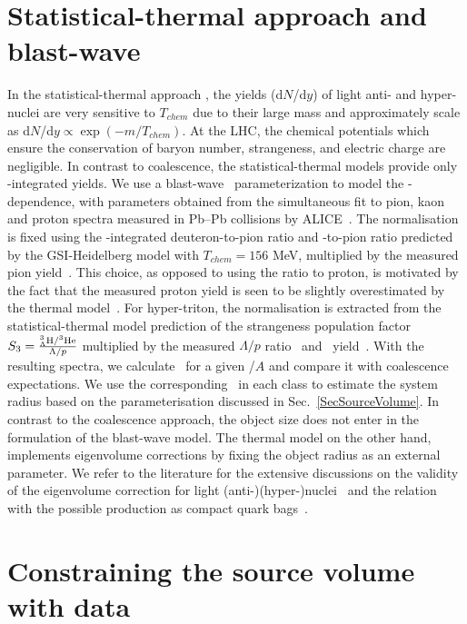\documentclass[%
 reprint,
 amsmath,amssymb,
 aps,
]{revtex4-1}
\begin{document}
\section{Statistical-thermal approach and blast-wave}\label{sec:thermal}
In the statistical-thermal approach \cite{Petran:2013dva,Wheaton:2004qb,Andronic:2005yp}, the yields (d$N$/d$y$) of light anti- and hyper-nuclei are very sensitive to $T_{chem}$ due to their large mass and approximately scale as d$N$/d$y \propto \exp(-m/T_{chem})$. 
At the LHC, the chemical potentials which ensure the conservation of baryon number, strangeness, and electric charge are negligible.
In contrast to coalescence, the statistical-thermal models provide only \pt-integrated yields. 
We use a blast-wave~\cite{Schnedermann:1993ws} parameterization to model the \pt-dependence, with parameters obtained from the simultaneous fit to pion, kaon and proton spectra measured in Pb--Pb collisions by ALICE~\cite{Abelev:2013vea}. 
The normalisation is fixed using the \pt-integrated deuteron-to-pion ratio and \hethree-to-pion ratio predicted by the GSI-Heidelberg model with $T_{chem} = 156$ MeV, multiplied by the measured pion yield~\cite{Abelev:2013vea}. 
This choice, as opposed to using the ratio to proton, is motivated by the fact that the measured proton yield is seen to be slightly overestimated by the thermal model~\cite{Abelev:2012wca}.
For hyper-triton, the normalisation is extracted from the statistical-thermal model prediction of the strangeness population factor $S_{3} = { _{\Lambda}^{3}\mathrm{H} / ^{3}{\mathrm{He}} \over \Lambda/p}$ multiplied by the measured $\Lambda/p$ ratio~\cite{Abelev:2013vea,Abelev:2013xaa} and \hethree~yield~\cite{ALICE:deuteronppPbPb2015}. 
With the resulting spectra, we calculate \bA~for a given \pt/$A$ and compare it with coalescence expectations. 
We use the corresponding \avdNdeta~in each class to estimate the system radius based on the parameterisation discussed in Sec.~\ref{SecSourceVolume}. 
In contrast to the coalescence approach, the object size does not enter in the formulation of the blast-wave model.
The thermal model on the other hand, implements eigenvolume corrections by fixing the object radius as an external parameter.
We refer to the literature for the extensive discussions on the validity of the eigenvolume correction for light \mbox{(anti-)(hyper-)}nuclei~\cite{Vovchenko:2016mwg} and the relation with the possible production as compact quark bags~\cite{Andronic:2017}.

\section{Constraining the source volume with data}\label{sec:radiiParamet}
\end{document}
